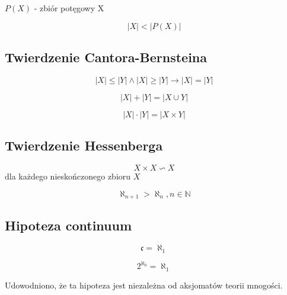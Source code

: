 \documentclass{../notatki}
\begin{document}
$P(X)$ - zbiór potęgowy X

$$
|X| < |P(X)|
$$

\subsection{Twierdzenie Cantora-Bernsteina}

$$
|X| \le |Y| \land |X| \ge |Y| \rightarrow |X| = |Y|
$$

$$
|X| + |Y| = |X \cup Y|
$$

$$
|X| \cdot |Y| = |X \times Y|
$$

\subsection{Twierdzenie Hessenberga}

$$
X \times X \backsim X
$$
dla każdego nieskończonego zbioru $X$

$$
\aleph_{n + 1} > \aleph_n, n \in \mathbb{N}
$$

\subsection{Hipoteza continuum}

$$
\mathfrak{c} = \aleph_1
$$

$$
2^{\aleph_0} = \aleph_1
$$

Udowodniono, że ta hipoteza jest niezależna od aksjomatów teorii mnogości.
\end{document}
